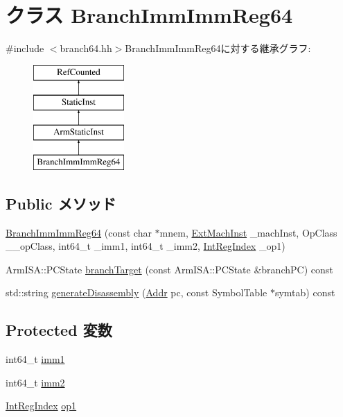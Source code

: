 \hypertarget{classArmISA_1_1BranchImmImmReg64}{
\section{クラス BranchImmImmReg64}
\label{classArmISA_1_1BranchImmImmReg64}
}


{\ttfamily \#include $<$branch64.hh$>$}BranchImmImmReg64に対する継承グラフ:\begin{figure}[H]
\begin{center}
\leavevmode
\includegraphics[height=4cm]{classArmISA_1_1BranchImmImmReg64}
\end{center}
\end{figure}
\subsection*{Public メソッド}
\begin{DoxyCompactItemize}
\item 
\hyperlink{classArmISA_1_1BranchImmImmReg64_a86edd27123a15e844baec14f26bb7252}{BranchImmImmReg64} (const char $\ast$mnem, \hyperlink{classStaticInst_a5605d4fc727eae9e595325c90c0ec108}{ExtMachInst} \_\-machInst, OpClass \_\-\_\-opClass, int64\_\-t \_\-imm1, int64\_\-t \_\-imm2, \hyperlink{namespaceArmISA_ae64680ba9fb526106829d6bf92fc791b}{IntRegIndex} \_\-op1)
\item 
ArmISA::PCState \hyperlink{classArmISA_1_1BranchImmImmReg64_aef1dd7539a8d8c49730120f2c0b8088e}{branchTarget} (const ArmISA::PCState \&branchPC) const 
\item 
std::string \hyperlink{classArmISA_1_1BranchImmImmReg64_a95d323a22a5f07e14d6b4c9385a91896}{generateDisassembly} (\hyperlink{classm5_1_1params_1_1Addr}{Addr} pc, const SymbolTable $\ast$symtab) const 
\end{DoxyCompactItemize}
\subsection*{Protected 変数}
\begin{DoxyCompactItemize}
\item 
int64\_\-t \hyperlink{classArmISA_1_1BranchImmImmReg64_a6ccc7c2674222b503fff1477061ccdfa}{imm1}
\item 
int64\_\-t \hyperlink{classArmISA_1_1BranchImmImmReg64_a0c27335409ea85af7c62f6d73dfab8c8}{imm2}
\item 
\hyperlink{namespaceArmISA_ae64680ba9fb526106829d6bf92fc791b}{IntRegIndex} \hyperlink{classArmISA_1_1BranchImmImmReg64_a4c465c43ad568f8bcf8ae71480e9cfea}{op1}
\end{DoxyCompactItemize}


